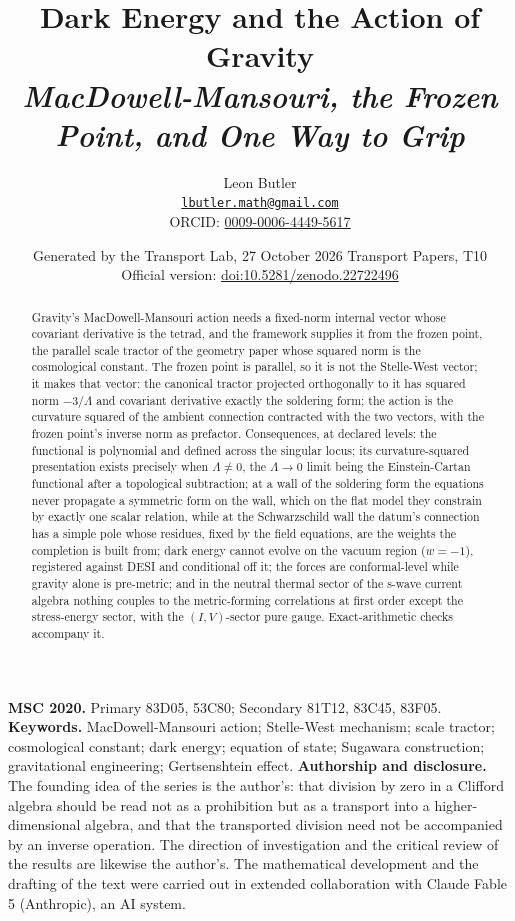 \documentclass[11pt]{article}
\title{\bfseries Dark Energy and the Action of Gravity\\[4pt]\large\itshape MacDowell-Mansouri, the Frozen Point, and One Way to Grip}
\author{Leon Butler\\ \normalsize\href{mailto:lbutler.math@gmail.com}{\texttt{lbutler.math@gmail.com}}\\ \normalsize ORCID: \href{https://orcid.org/0009-0006-4449-5617}{0009-0006-4449-5617}}
\date{Generated by the Transport Lab, 27 October 2026 \textperiodcentered{} Transport Papers, T10\\[3pt]\small Official version: \href{https://doi.org/10.5281/zenodo.22722496}{doi:10.5281/zenodo.22722496}}
\theoremstyle{definition}
\theoremstyle{plain}
\begin{document}
\maketitle
\begin{abstract}
\normalsize
Gravity's MacDowell-Mansouri action needs a fixed-norm internal vector whose covariant derivative is the tetrad, and the framework supplies it from the frozen point, the parallel scale tractor of the geometry paper whose squared norm is the cosmological constant. The frozen point is parallel, so it is not the Stelle-West vector; it makes that vector: the canonical tractor projected orthogonally to it has squared norm $-3/\Lambda$ and covariant derivative exactly the soldering form; the action is the curvature squared of the ambient connection contracted with the two vectors, with the frozen point's inverse norm as prefactor. Consequences, at declared levels: the functional is polynomial and defined across the singular locus; its curvature-squared presentation exists precisely when $\Lambda \neq 0$, the $\Lambda \to 0$ limit being the Einstein-Cartan functional after a topological subtraction; at a wall of the soldering form the equations never propagate a symmetric form on the wall, which on the flat model they constrain by exactly one scalar relation, while at the Schwarzschild wall the datum's connection has a simple pole whose residues, fixed by the field equations, are the weights the completion is built from; dark energy cannot evolve on the vacuum region ($w = -1$), registered against DESI and conditional off it; the forces are conformal-level while gravity alone is pre-metric; and in the neutral thermal sector of the s-wave current algebra nothing couples to the metric-forming correlations at first order except the stress-energy sector, with the $(I,V)$-sector pure gauge. Exact-arithmetic checks accompany it.
\end{abstract}
\medskip
\noindent\textbf{MSC 2020.} Primary 83D05, 53C80; Secondary 81T12, 83C45, 83F05.\\
\textbf{Keywords.} MacDowell-Mansouri action; Stelle-West mechanism; scale tractor; cosmological constant; dark energy; equation of state; Sugawara construction; gravitational engineering; Gertsenshtein effect.
\newpage
\noindent \textbf{Authorship and disclosure. }The founding idea of the series is the author's: that division by zero in a Clifford algebra should be read not as a prohibition but as a transport into a higher-dimensional algebra, and that the transported division need not be accompanied by an inverse operation. The direction of investigation and the critical review of the results are likewise the author's. The mathematical development and the drafting of the text were carried out in extended collaboration with Claude Fable 5 (Anthropic), an AI system.
\end{document}
